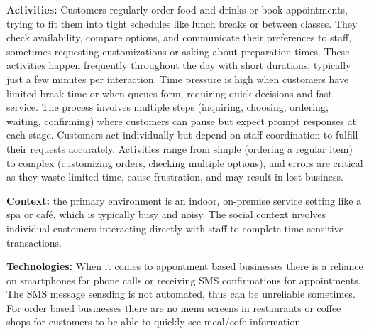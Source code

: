 \documentclass[]{VUMIFTemplateClass}
\begin{document}
    \textbf{Activities:} Customers regularly order food and drinks or book
    appointments, trying to fit them into tight schedules like lunch breaks or
    between classes. They check availability, compare options, and communicate their
    preferences to staff, sometimes requesting customizations or asking about
    preparation times. These activities happen frequently throughout the day with
    short durations, typically just a few minutes per interaction. Time pressure is
    high when customers have limited break time or when queues form, requiring quick
    decisions and fast service. The process involves multiple steps (inquiring,
    choosing, ordering, waiting, confirming) where customers can pause but expect
    prompt responses at each stage. Customers act individually but depend on staff
    coordination to fulfill their requests accurately. Activities range from simple
    (ordering a regular item) to complex (customizing orders, checking multiple
    options), and errors are critical as they waste limited time, cause frustration,
    and may result in lost business.

\textbf{Context:} the primary environment is an indoor, on-premise service setting like a spa or café, which is typically busy and noisy. The social context involves individual customers interacting directly with staff to complete time-sensitive transactions. 

\textbf{Technologies:} When it comes to appontment based businesses there is a reliance on smartphones for phone calls or receiving SMS confirmations for appointments. The SMS message sensding is not automated, thus can be unreliable sometimes. For order based businesses there are no menu screens in restaurants or coffee shops for customers to be able to quickly see meal/cofe information.
\end{document}
